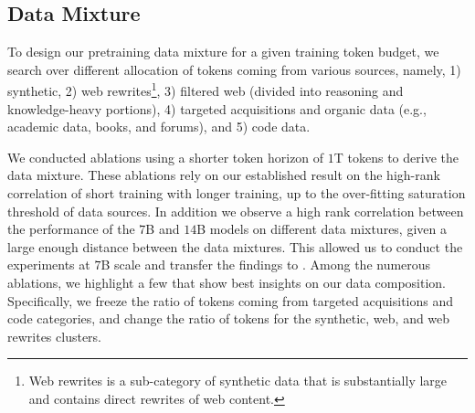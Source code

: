 \subsection{Data Mixture}
To design our pretraining data mixture for a given training token budget, we search over different allocation of tokens coming from various sources, namely, 1) synthetic, 2) web rewrites\footnote{Web rewrites is a sub-category of synthetic data that is substantially large and contains direct rewrites of web content.}, 3) filtered web (divided into reasoning and knowledge-heavy portions), 4) targeted acquisitions and organic data (e.g., academic data, books, and forums), and 5) code data. 

We conducted ablations using a shorter token horizon of $1$T tokens to derive the data mixture. These ablations rely on our established result on the high-rank correlation of short training with longer training, up to the over-fitting saturation threshold of data sources. In addition we observe a high rank correlation between the performance of the $7$B and $14$B models on different data mixtures, given a large enough distance between the data mixtures. This allowed us to conduct the experiments at $7$B scale and transfer the findings to \modelwithoutspace. Among the numerous ablations, we highlight a few that show best insights on our data composition. Specifically, we freeze the ratio of tokens coming from targeted acquisitions and code categories, and change the ratio of tokens for the synthetic, web, and web rewrites clusters. 

\begin{table}[ht]
\centering
{}
\caption{Ablations on the allocation of $75\%$ of training tokens to synthetic (S), filtered web (W), and web rewrite (WR) categories, while other data sources are held constant in the remaining $25\%$ token budget. All benchmark numbers are measured relative to the final data mixture used for training \modelwithoutspace.}
\label{tab:data_mixture_ablation}
\end{table}

